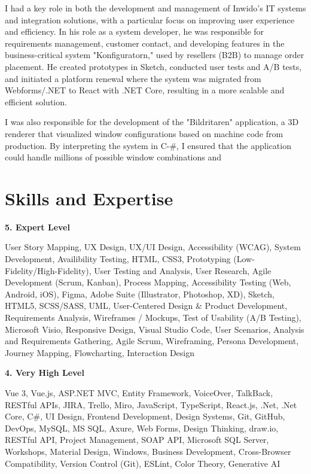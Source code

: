 \documentclass[a4paper,10pt]{article}
\begin{document}
I had a key role in both the development and management of Inwido's IT systems and integration solutions, with a particular focus on improving user experience and efficiency. In his role as a system developer, he was responsible for requirements management, customer contact, and developing features in the business-critical system "Konfiguratorn," used by resellers (B2B) to manage order placement. He created prototypes in Sketch, conducted user tests and A/B tests, and initiated a platform renewal where the system was migrated from Webforms/.NET to React with .NET Core, resulting in a more scalable and efficient solution.

I was also responsible for the development of the "Bildritaren" application, a 3D renderer that visualized window configurations based on machine code from production. By interpreting the system in C-\#, I ensured that the application could handle millions of possible window combinations and


\section*{Skills and Expertise}

\textbf{5. Expert Level}

User Story Mapping, UX Design, UX/UI Design, Accessibility (WCAG), System Development, Availibility Testing, HTML, CSS3, Prototyping (Low-Fidelity/High-Fidelity), User Testing and Analysis, User Research, Agile Development (Scrum, Kanban), Process Mapping, Accessibility Testing (Web, Android, iOS), Figma, Adobe Suite (Illustrator, Photoshop, XD), Sketch, HTML5, SCSS/SASS, UML, User-Centered Design \& Product Development, Requirements Analysis, Wireframes / Mockups, Test of Usability (A/B Testing), Microsoft Visio, Responsive Design, Visual Studio Code, User Scenarios, Analysis and Requirements Gathering, Agile Scrum, Wireframing, Persona Development, Journey Mapping, Flowcharting, Interaction Design
\vspace{0.3cm}

\textbf{4. Very High Level}

Vue 3, Vue.js, ASP.NET MVC, Entity Framework, VoiceOver, TalkBack, RESTful APIs, JIRA, Trello, Miro, JavaScript, TypeScript, React.js, .Net, .Net Core, C\#, UI Design, Frontend Development, Design Systems, Git, GitHub, DevOps, MySQL, MS SQL, Axure, Web Forms, Design Thinking, draw.io, RESTful API, Project Management, SOAP API, Microsoft SQL Server, Workshops, Material Design, Windows, Business Development, Cross-Browser Compatibility, Version Control (Git), ESLint, Color Theory, Generative AI
\vspace{0.5cm}
\end{document}
